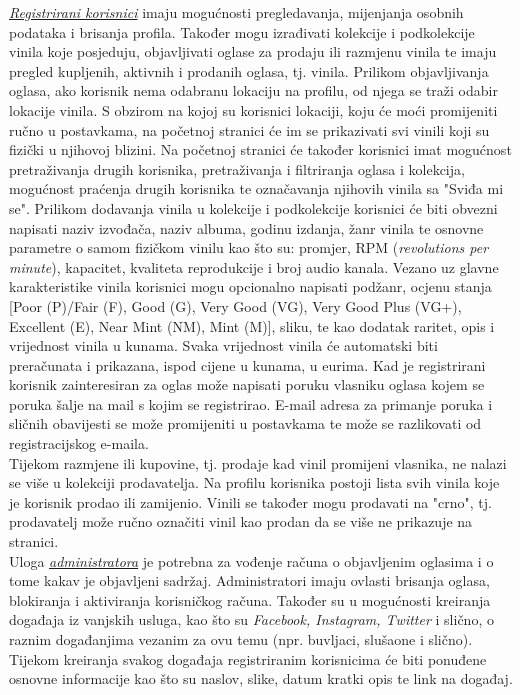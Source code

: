 	 \textit{\underline{Registrirani korisnici}} imaju mogućnosti pregledavanja, mijenjanja osobnih podataka i brisanja profila. Također mogu izrađivati kolekcije i podkolekcije vinila koje posjeduju, objavljivati oglase za prodaju ili razmjenu vinila te imaju pregled kupljenih, aktivnih i prodanih oglasa, tj. vinila. Prilikom objavljivanja oglasa, ako korisnik nema odabranu lokaciju na profilu, od njega se traži odabir lokacije vinila. S obzirom na kojoj su korisnici lokaciji, koju će moći promijeniti ručno u postavkama, na početnoj stranici će im se prikazivati svi vinili koji su fizički u njihovoj blizini. Na početnoj stranici će također korisnici imat mogućnost pretraživanja drugih korisnika, pretraživanja i filtriranja oglasa i kolekcija, mogućnost praćenja drugih korisnika te označavanja njihovih vinila sa "Sviđa mi se". Prilikom dodavanja vinila u kolekcije i podkolekcije korisnici će biti obvezni napisati naziv izvođača, naziv albuma, godinu izdanja, žanr vinila te osnovne parametre o samom fizičkom vinilu kao što su: promjer, RPM (\textit{revolutions per minute}), kapacitet, kvaliteta reprodukcije i broj audio kanala. Vezano uz glavne karakteristike vinila korisnici mogu opcionalno napisati podžanr, ocjenu stanja [Poor (P)/Fair (F), Good (G), Very Good (VG), Very Good Plus (VG+), Excellent (E), Near Mint (NM), Mint (M)], sliku, te kao dodatak raritet, opis i vrijednost vinila u kunama. Svaka vrijednost vinila će automatski biti preračunata i prikazana, ispod cijene u kunama, u eurima. Kad je registrirani korisnik zainteresiran za oglas može napisati poruku vlasniku oglasa kojem se poruka šalje na mail s kojim se registrirao. E-mail adresa za primanje poruka i sličnih obavijesti se može promijeniti u postavkama te može se razlikovati od registracijskog e-maila.\\
	 
	  \text Tijekom razmjene ili kupovine, tj. prodaje kad vinil promijeni vlasnika, ne nalazi se više u kolekciji prodavatelja. Na profilu korisnika postoji lista svih vinila koje je korisnik prodao ili zamijenio. Vinili se također mogu prodavati na "crno", tj. prodavatelj može ručno označiti vinil kao prodan da se više ne prikazuje na stranici.\\
	 
	 Uloga \textit{\underline{administratora}} je potrebna za vođenje računa o objavljenim oglasima i o tome kakav je objavljeni sadržaj. Administratori imaju ovlasti brisanja oglasa, blokiranja i aktiviranja korisničkog računa. Također su u mogućnosti kreiranja događaja iz vanjskih usluga, kao što su \textit{Facebook, Instagram, Twitter} i slično, o raznim događanjima vezanim za ovu temu (npr. buvljaci, slušaone i slično). Tijekom kreiranja svakog događaja registriranim korisnicima će biti ponuđene osnovne informacije kao što su naslov, slike, datum kratki opis te link na događaj.\\
	 
